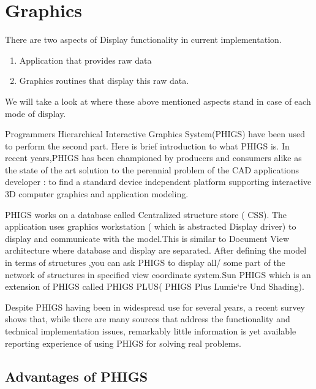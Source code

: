     \chapter{Graphics} \label{appgra}

    There are two aspects of Display functionality in current implementation.

    \begin{enumerate}

        \item
        Application that provides raw data
        \item
        Graphics routines that display this raw data.

    \end{enumerate}

    We will take a look at where these above mentioned aspects stand in
    case of each mode of display.


    Programmers Hierarchical Interactive Graphics System(PHIGS) have been used
    to perform the second part. Here is brief introduction to what PHIGS is.
    In recent years,PHIGS has been championed by producers and consumers alike
    as the
    state of the art solution to the perennial problem of the CAD applications
    developer : to find a standard device independent platform supporting
    interactive 3D computer graphics and application modeling.~\cite{Howard}

    PHIGS works on a database called Centralized structure store ( CSS). The
    application uses graphics workstation ( which is abstracted Display driver)
    to display and communicate with the model.This is similar to Document View
    architecture where database and display are separated.  After defining the
    model in terms of structures ,you can ask PHIGS to display all/ some part
    of the network of structures in specified view coordinate system.Sun PHIGS
    which is an extension of PHIGS called PHIGS PLUS( PHIGS Plus Lumie`re Und
    Shading).


    Despite PHIGS having been in widespread use for several years, a recent
    survey shows that, while there are many sources that address the
    functionality and technical implementation issues, remarkably little
    information is yet available reporting experience of using PHIGS for solving
    real problems.~\cite{Howard}


    \section{Advantages of PHIGS }

